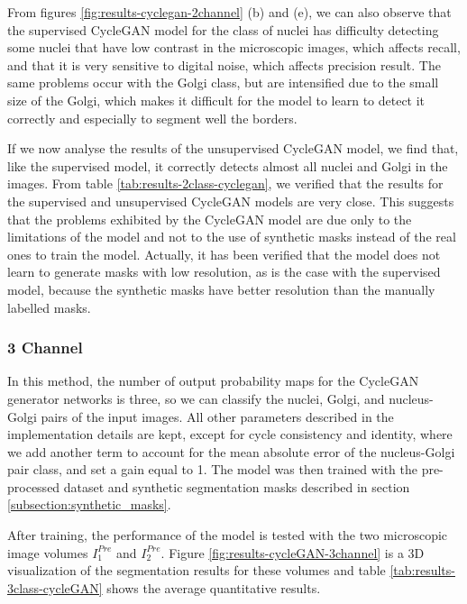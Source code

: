 From figures \ref{fig:results-cyclegan-2channel} (b) and (e), we can also observe that the supervised CycleGAN model for the class of nuclei has difficulty detecting some nuclei that have low contrast in the microscopic images, which affects recall, and that it is very sensitive to digital noise, which affects precision result. The same problems occur with the Golgi class, but are intensified due to the small size of the Golgi, which makes it difficult for the model to learn to detect it correctly and especially to segment well the borders.

If we now analyse the results of the unsupervised CycleGAN model, we find that, like the supervised model, it correctly detects almost all nuclei and Golgi in the images. From table \ref{tab:results-2class-cyclegan}, we verified that the results for the supervised and unsupervised CycleGAN models are very close. This suggests that the problems exhibited by the CycleGAN model are due only to the limitations of the model and not to the use of synthetic masks instead of the real ones to train the model. Actually, it has been verified that the model does not learn to generate masks with low resolution, as is the case with the supervised model, because the synthetic masks have better resolution than the manually labelled masks.


\subsubsection*{3 Channel}

In this method, the number of output probability maps for the CycleGAN generator networks is three, so we can classify the nuclei, Golgi, and nucleus-Golgi pairs of the input images. All other parameters described in the implementation details are kept, except for cycle consistency and identity, where we add another term to account for the mean absolute error of the nucleus-Golgi pair class, and set a gain equal to 1. The model was then trained with the pre-processed dataset and synthetic segmentation masks described in section \ref{subsection:synthetic_masks}.

After training, the performance of the model is tested with the two microscopic image volumes $I^{Pre}_1$ and $I^{Pre}_2$. Figure \ref{fig:results-cycleGAN-3channel} is a 3D visualization of the segmentation results for these volumes and table \ref{tab:results-3class-cycleGAN} shows the average quantitative results.

